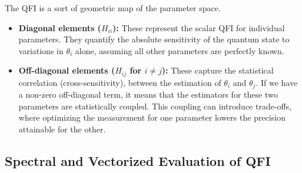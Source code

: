 \begin{remark}
    The QFI is a sort of geometric map of the parameter space.
    \begin{itemize}
        \item \textbf{Diagonal elements ($H_{ii}$):} These represent the scalar QFI for individual parameters. They quantify the absolute sensitivity of the quantum state to variations in $\theta_i$ alone, assuming all other parameters are perfectly known.
        \item \textbf{Off-diagonal elements ($H_{ij}$ for $i \neq j$):} These capture the statistical correlation (cross-sensitivity), between the estimation of $\theta_i$ and $\theta_j$. If we have a non-zero off-diagonal term, it means that the estimators for these two parameters are statistically coupled. This coupling can introduce trade-offs, where optimizing the measurement for one parameter lowers the precision attainable for the other.
    \end{itemize}
\end{remark}

\subsection{Spectral and Vectorized Evaluation of QFI}

